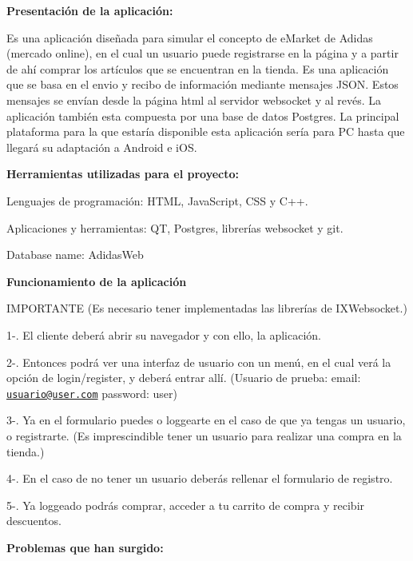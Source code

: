 



{\bfseries Presentación de la aplicación\+:}

Es una aplicación diseñada para simular el concepto de e\+Market de Adidas (mercado online), en el cual un usuario puede registrarse en la página y a partir de ahí comprar los artículos que se encuentran en la tienda. Es una aplicación que se basa en el envio y recibo de información mediante mensajes J\+S\+ON. Estos mensajes se envían desde la página html al servidor websocket y al revés. La aplicación también esta compuesta por una base de datos Postgres. La principal plataforma para la que estaría disponible esta aplicación sería para PC hasta que llegará su adaptación a Android e i\+OS.

{\bfseries Herramientas utilizadas para el proyecto\+:}


\begin{DoxyItemize}
\item Lenguajes de programación\+: H\+T\+ML, Java\+Script, C\+SS y C++.
\item Aplicaciones y herramientas\+: QT, Postgres, librerías websocket y git.
\item Database name\+: Adidas\+Web
\end{DoxyItemize}

{\bfseries Funcionamiento de la aplicación}

I\+M\+P\+O\+R\+T\+A\+N\+TE (Es necesario tener implementadas las librerías de I\+X\+Websocket.)

1-\/. El cliente deberá abrir su navegador y con ello, la aplicación.

2-\/. Entonces podrá ver una interfaz de usuario con un menú, en el cual verá la opción de login/register, y deberá entrar allí. (Usuario de prueba\+: email\+: \href{mailto:usuario@user.com}{\tt usuario@user.\+com} password\+: user)

3-\/. Ya en el formulario puedes o loggearte en el caso de que ya tengas un usuario, o registrarte. (Es imprescindible tener un usuario para realizar una compra en la tienda.)

4-\/. En el caso de no tener un usuario deberás rellenar el formulario de registro.

5-\/. Ya loggeado podrás comprar, acceder a tu carrito de compra y recibir descuentos.





{\bfseries Problemas que han surgido\+:}


